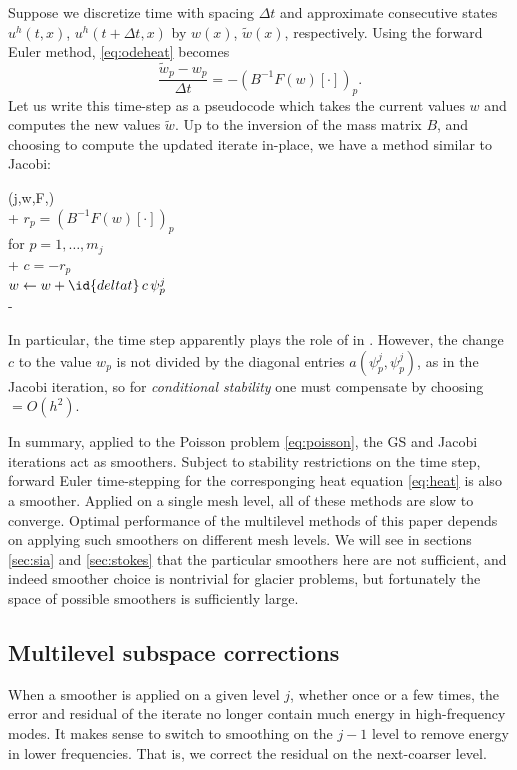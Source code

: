 \documentclass[letterpaper,final,12pt,reqno]{amsart}
\theoremstyle{claim}
\numberwithin{equation}{section}
\numberwithin{figure}{section}
\numberwithin{table}{section}
\numberwithin{theorem}{section}
\begin{document}
Suppose we discretize time with spacing $\Delta t$ and approximate consecutive states $u^h(t,x)$, $u^h(t+\Delta t,x)$ by $w(x)$, $\tilde w(x)$, respectively.  Using the forward Euler method, \eqref{eq:odeheat} becomes
\begin{equation}
\frac{\tilde w_p - w_p}{\Delta t} = - (B^{-1} F(w)[\cdot])_p. \label{eq:forwardeulerheat}
\end{equation}
Let us write this time-step as a pseudocode which takes the current values $w$ and computes the new values $\tilde w$.  Up to the inversion of the mass matrix $B$, and choosing to compute the updated iterate in-place, we have a method similar to Jacobi:
\begin{pseudo*} \label{ps:euler-timestep}
(j,w,F,)\text{:} \\+
    $r_p = (B^{-1} F(w)[\cdot])_p$ \qquad\qquad\qquad\qquad {} \\
    for $p=1,\dots,m_j$ \\+
        $\displaystyle c = - r_p$  \\
        $w \gets w + \id{deltat}\, c\, \psi_p^j$ \\-
\end{pseudo*}
In particular, the time step  apparently plays the role of  in .  However, the change $c$ to the value $w_p$ is not divided by the diagonal entries $a(\psi_p^j,\psi_p^j)$, as in the Jacobi iteration, so for \emph{conditional stability} \cite{Bueler2021} one must compensate by choosing  $=O(h^2)$.

In summary, applied to the Poisson problem \eqref{eq:poisson}, the GS and Jacobi iterations act as smoothers.  Subject to stability restrictions on the time step, forward Euler time-stepping for the corresponging heat equation \eqref{eq:heat} is also a smoother.  Applied on a single mesh level, all of these methods are slow to converge.  Optimal performance of the multilevel methods of this paper depends on applying such smoothers on different mesh levels.  We will see in sections \ref{sec:sia} and \ref{sec:stokes} that the particular smoothers here are not sufficient, and indeed smoother choice is nontrivial for glacier problems, but fortunately the space of possible smoothers is sufficiently large.

\subsection*{Multilevel subspace corrections}  When a smoother is applied on a given level $j$, whether once or a few times, the error and residual of the iterate no longer contain much energy in high-frequency modes.  It makes sense to switch to smoothing on the $j-1$ level to remove energy in lower frequencies.  That is, we correct the residual on the next-coarser level.
\end{document}
